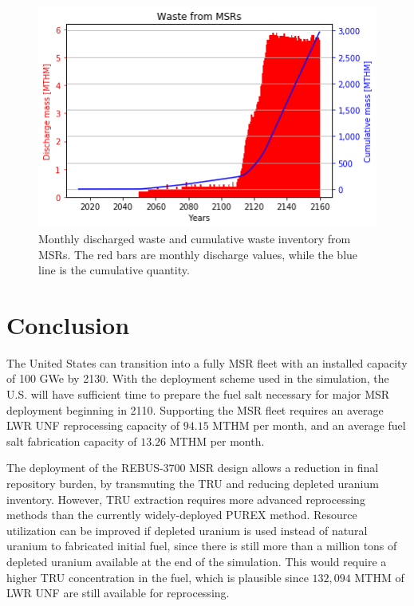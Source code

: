 \begin{figure}[htbp!]
	\begin{center}
		\includegraphics[scale=0.7]{./images/us/msr_waste.png}
	\end{center}
	\caption{Monthly discharged waste and cumulative waste inventory from
			\glspl{MSR}. The red bars are monthly discharge values, while
			the blue line is the cumulative quantity.}
	\label{fig:msr_waste}
\end{figure}


\section{Conclusion}
The United States can transition into a fully \gls{MSR} fleet with an
installed capacity of 100 GWe by 2130. With the deployment
scheme used in the simulation, the U.S. will have sufficient
time to prepare the fuel salt necessary for major \gls{MSR} deployment
beginning in 2110. Supporting the \gls{MSR} fleet requires an average
\gls{LWR} \gls{UNF} reprocessing capacity of $94.15$ MTHM per month, and an average fuel salt
fabrication capacity of $13.26$ MTHM per month. 

The deployment of the REBUS-3700 \gls{MSR} design allows a reduction
in final repository burden, by transmuting the \gls{TRU} and reducing depleted uranium inventory.
However, \gls{TRU} extraction requires more advanced reprocessing methods than the currently
widely-deployed PUREX method. Resource utilization can be improved if depleted
uranium is used instead of natural uranium to fabricated initial fuel, since
there is still more than a million tons of depleted uranium available at the
end of the simulation. This would require a higher \gls{TRU} concentration
in the fuel, which is plausible since $132,094$ MTHM of \gls{LWR} \gls{UNF}
are still available for reprocessing.

